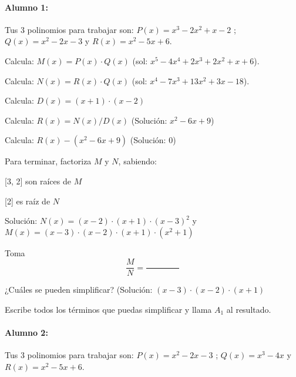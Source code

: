 


\paragraph{Alumno 1:\\}



Tus 3 polinomios para trabajar son: $P(x) =  x^3 - 2x^2 + x - 2 $ ; $Q(x) =  x^2 - 2x - 3 $ y $R(x) =  x^2 - 5x + 6 $.



Calcula: $M(x) = P(x)\cdot  Q(x)$ (sol: $ x^5 - 4x^4 + 2x^3 + 2x^2 + x + 6 $).

Calcula: $N(x) = R(x)\cdot  Q(x)$ (sol: $ x^4 - 7x^3 + 13x^2 + 3x - 18 $).

Calcula: $D(x) = ( x + 1 )\cdot  ( x - 2 )$

Calcula: $R(x) = N(x) / D(x)$ (Solución: $ x^2 - 6x + 9 $)

Calcula: $R(x) - ( x^2 - 6x + 9 )$ (Solución: $ 0 $)

Para terminar, factoriza $M$ y $N$, sabiendo:

     [3, 2]  son raíces de $M$

     [2]  es raíz de $N$

Solución: $N(x) =  (x - 2) \cdot  (x + 1) \cdot  (x - 3)^2 $ y $M(x) =  (x - 3) \cdot  (x - 2) \cdot  (x + 1) \cdot  (x^2 + 1) $

Toma \[\frac{M}{N} = \frac{\quad\quad\quad\quad}{\quad\quad\quad\quad}\]

¿Cuáles se pueden simplificar? (Solución: $ (x - 3) \cdot  (x - 2) \cdot  (x + 1) $

Escribe todos los términos que puedas simplificar y llama $A_1$ al resultado.













\paragraph{Alumno 2:\\}



Tus 3 polinomios para trabajar son: $P(x) =  x^2 - 2x - 3 $ ; $Q(x) =  x^3 - 4x $ y $R(x) =  x^2 - 5x + 6 $.



